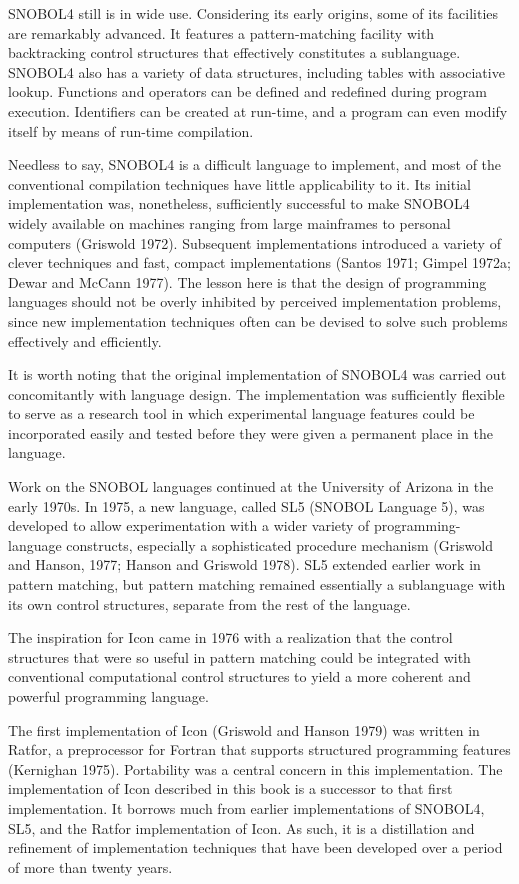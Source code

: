 SNOBOL4 still is in wide use. Considering its early origins, some of
its facilities are remarkably advanced. It features a pattern-matching
facility with backtracking control structures that effectively
constitutes a sublanguage. SNOBOL4 also has a variety of data
structures, including tables with associative lookup. Functions and
operators can be defined and redefined during program execution.
Identifiers can be created at run-time, and a program can even modify
itself by means of run-time compilation.

Needless to say, SNOBOL4 is a difficult language to implement, and
most of the conventional compilation techniques have little
applicability to it. Its initial implementation was, nonetheless,
sufficiently successful to make SNOBOL4 widely available on machines
ranging from large mainframes to personal computers (Griswold
1972). Subsequent implementations introduced a variety of clever
techniques and fast, compact implementations (Santos 1971; Gimpel
1972a; Dewar and McCann 1977). The lesson here is that the design of
programming languages should not be overly inhibited by perceived
implementation problems, since new implementation techniques often can
be devised to solve such problems effectively and efficiently.

It is worth noting that the original implementation of SNOBOL4 was
carried out concomitantly with language design. The implementation was
sufficiently flexible to serve as a research tool in which
experimental language features could be incorporated easily and tested
before they were given a permanent place in the language.

Work on the SNOBOL languages continued at the University of Arizona in
the early 1970s. In 1975, a new language, called SL5
({\textquotedbl}SNOBOL Language 5{\textquotedbl}), was developed to
allow experimentation with a wider variety of programming-language
constructs, especially a sophisticated procedure mechanism (Griswold
and Hanson, 1977; Hanson and Griswold 1978). SL5 extended earlier work
in pattern matching, but pattern matching remained essentially a
sublanguage with its own control structures, separate from the rest of
the language.

The inspiration for Icon came in 1976 with a realization that the
control structures that were so useful in pattern matching could be
integrated with conventional computational control structures to yield
a more coherent and powerful programming language.


The first implementation of Icon (Griswold and Hanson 1979) was
written in Ratfor, a preprocessor for Fortran that supports structured
programming features (Kernighan 1975). Portability was a central
concern in this implementation.  The implementation of Icon described
in this book is a successor to that first implementation. It borrows
much from earlier implementations of SNOBOL4, SL5, and the Ratfor
implementation of Icon. As such, it is a distillation and refinement
of implementation techniques that have been developed over a period of
more than twenty years.


\bigskip
